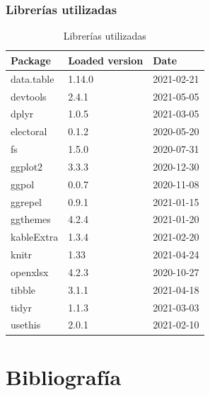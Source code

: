 \documentclass[12pt,a4paper,]{book}
\def\ifdoblecara{} %
\def\ifcitapandoc{} %
\let\ifcitapandoc\undefined %
\numberwithin{dummy}{section}
\theoremstyle{ocrenumbox}
\theoremstyle{blacknumex}
\theoremstyle{blacknumbox}
\theoremstyle{ocrenum}
\theoremstyle{ocrenum}
\begin{document}
\hypertarget{libreruxedas-utilizadas}{%
\subsection{Librerías utilizadas}\label{libreruxedas-utilizadas}}

\renewcommand{\arraystretch}{0.6}

\begin{table}[!h]

\caption[ ]{\label{tab:Reproducibility-SessionInfo-R-packages}Librerías utilizadas}
\centering
\begin{tabular}[t]{lll}
\toprule
Package & Loaded version & Date\\
\midrule
data.table & 1.14.0 & 2021-02-21\\
devtools & 2.4.1 & 2021-05-05\\
dplyr & 1.0.5 & 2021-03-05\\
electoral & 0.1.2 & 2020-05-20\\
fs & 1.5.0 & 2020-07-31\\
\addlinespace
ggplot2 & 3.3.3 & 2020-12-30\\
ggpol & 0.0.7 & 2020-11-08\\
ggrepel & 0.9.1 & 2021-01-15\\
ggthemes & 4.2.4 & 2021-01-20\\
kableExtra & 1.3.4 & 2021-02-20\\
\addlinespace
knitr & 1.33 & 2021-04-24\\
openxlsx & 4.2.3 & 2020-10-27\\
tibble & 3.1.1 & 2021-04-18\\
tidyr & 1.1.3 & 2021-03-03\\
usethis & 2.0.1 & 2021-02-10\\
\bottomrule
\end{tabular}
\end{table}
\renewcommand{\arraystretch}{1}

\FloatBarrier
\cleardoublepage

\ifdefined\ifdoblecara
  \fancyhead[LE,RO]{}
  \fancyfoot[LO,RE]{}
\else
  \fancyhead[RO]{}
  \fancyfoot[LO]{}
\fi

\ifdefined\ifcitapandoc

\hypertarget{bibliografuxeda}{%
\chapter*{Bibliografía}\label{bibliografuxeda}}

\else

\nocite{*}

\fi




\end{document}
